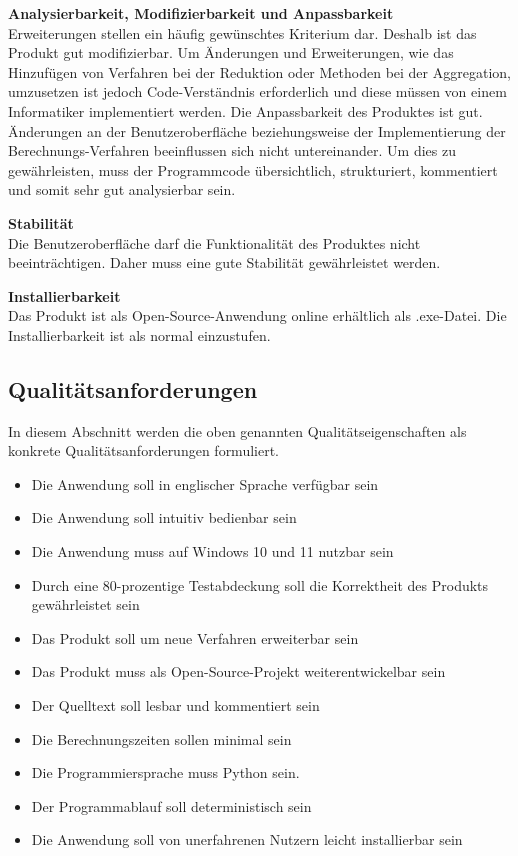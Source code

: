 \documentclass[parskip=full]{scrartcl} %
\begin{document}
\textbf{Analysierbarkeit, Modifizierbarkeit und Anpassbarkeit}\\
Erweiterungen stellen ein häufig gewünschtes Kriterium dar. Deshalb ist das Produkt gut modifizierbar. Um Änderungen und Erweiterungen, wie das Hinzufügen von Verfahren bei der Reduktion oder Methoden bei der Aggregation, umzusetzen ist jedoch Code-Verständnis erforderlich und diese müssen von einem Informatiker implementiert werden. Die Anpassbarkeit des Produktes ist gut. Änderungen an der Benutzeroberfläche beziehungsweise der Implementierung der Berechnungs-Verfahren beeinflussen sich nicht untereinander. Um dies zu gewährleisten, muss der Programmcode übersichtlich, strukturiert, kommentiert und somit sehr gut analysierbar sein.

\textbf{Stabilität}\\
Die Benutzeroberfläche darf die Funktionalität des Produktes nicht beeinträchtigen. Daher muss eine gute Stabilität gewährleistet werden.

\textbf{Installierbarkeit}\\
Das Produkt ist als Open-Source-Anwendung online erhältlich als .exe-Datei. Die Installierbarkeit ist als normal einzustufen.


\newpage 


\subsection{Qualitätsanforderungen}
In diesem Abschnitt werden die oben genannten Qualitätseigenschaften als konkrete Qualitätsanforderungen formuliert.

\begin{itemize}
    \item <Q1> Die Anwendung soll in englischer Sprache verfügbar sein
    \item <Q2> Die Anwendung soll intuitiv bedienbar sein
    \item <Q3> Die Anwendung muss auf Windows 10 und 11 nutzbar sein
    \item <Q4> Durch eine 80-prozentige Testabdeckung soll die Korrektheit des Produkts gewährleistet sein
    \item <Q5> Das Produkt soll um neue Verfahren erweiterbar sein
    \item <Q6> Das Produkt muss als Open-Source-Projekt weiterentwickelbar sein
    \item <Q7> Der Quelltext soll lesbar und kommentiert sein
    \item <Q8> Die Berechnungszeiten sollen minimal sein
    \item <Q9> Die Programmiersprache muss Python sein.
    \item <Q10> Der Programmablauf soll deterministisch sein
    \item <Q11> Die Anwendung soll von unerfahrenen Nutzern leicht installierbar sein
\end{itemize}
\end{document}

